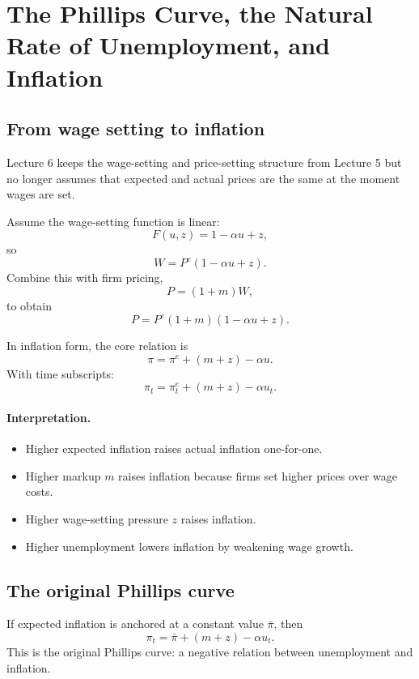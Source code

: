 \documentclass[12pt]{article}
\begin{document}
\section{The Phillips Curve, the Natural Rate of Unemployment, and Inflation}

\subsection{From wage setting to inflation}

Lecture 6 keeps the wage-setting and price-setting structure from Lecture 5 but no longer assumes that expected and actual prices are the same at the moment wages are set.

Assume the wage-setting function is linear:
\[
F(u,z)=1-\alpha u+z,
\]
so
\[
W=P^e(1-\alpha u+z).
\]
Combine this with firm pricing,
\[
P=(1+m)W,
\]
to obtain
\[
P=P^e(1+m)(1-\alpha u+z).
\]

\begin{keyformula}
In inflation form, the core relation is
\[
\pi=\pi^e+(m+z)-\alpha u.
\]
With time subscripts:
\[
\pi_t=\pi_t^e+(m+z)-\alpha u_t.
\]
\end{keyformula}

\paragraph{Interpretation.}
\begin{itemize}[leftmargin=1.5em]
\item Higher expected inflation raises actual inflation one-for-one.
\item Higher markup $m$ raises inflation because firms set higher prices over wage costs.
\item Higher wage-setting pressure $z$ raises inflation.
\item Higher unemployment lowers inflation by weakening wage growth.
\end{itemize}


\newpage
\subsection{The original Phillips curve}

If expected inflation is anchored at a constant value $\bar{\pi}$, then
\[
\pi_t=\bar{\pi}+(m+z)-\alpha u_t.
\]
This is the original Phillips curve: a negative relation between unemployment and inflation.

\begin{center}
\end{center}
\end{document}
